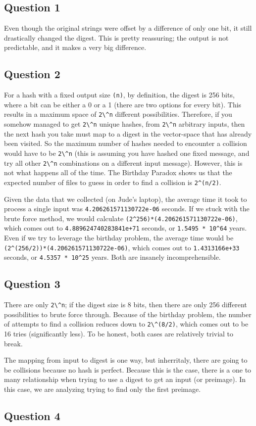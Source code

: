 \documentclass[11pt]{article}
\begin{document}
\subsection*{Question 1}
Even though the original strings were offset by a difference of only one bit, it still drastically changed the digest. This is pretty reassuring; the output is not predictable, and it makes a very big difference.

\subsection*{Question 2}
For a hash with a fixed output size \verb|(n)|, by definition, the digest is 256 bits, where a bit can be either a 0 or a 1 (there are two options for every bit). This results in a maximum space of \verb|2\^n| different possibilities. Therefore, if you somehow managed to get \verb|2\^n| unique hashes, from \verb|2\^n| arbitrary inputs, then the next hash you take must map to a digest in the vector-space that has already been visited. So the maximum number of hashes needed to encounter a collision would have to be \verb|2\^n| (this is assuming you have hashed one fixed message, and try all other \verb|2\^n| combinations on a different input message). However, this is not what happens all of the time. The Birthday Paradox shows us that the expected number of files to guess in order to find a collision is \verb|2^(n/2)|.

Given the data that we collected (on Jude's laptop), the average time it took to process a single input was \verb|4.206261571130722e-06| seconds. If we stuck with the brute force method, we would calculate \verb|(2^256)*(4.206261571130722e-06)|, which comes out to \verb|4.889624740283841e+71| seconds, or \verb|1.5495 * 10^64| years. Even if we try to leverage the birthday problem, the average time would be \verb|(2^(256/2))*(4.206261571130722e-06)|, which comes out to \verb|1.4313166e+33| seconds, or \verb|4.5357 * 10^25| years. Both are insanely incomprehensible.

\subsection*{Question 3}
There are only \verb|2\^n|; if the digest size is 8 bits, then there are only 256 different possibilities to brute force through. Because of the birthday problem, the number of attempts to find a collision reduces down to \verb|2\^(8/2)|, which comes out to be 16 tries (significantly less). To be honest, both cases are relatively trivial to break.

The mapping from input to digest is one way, but inherritaly, there are going to be collisions because no hash is perfect. Because this is the case, there is a one to many relationship when trying to use a digest to get an input (or preimage). In this case, we are analyzing trying to find only the first preimage. 

\subsection*{Question 4}
\end{document}
